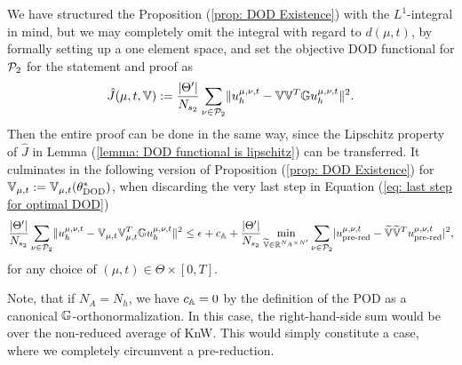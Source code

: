 \begin{remark} \label{remark: discrete optimal DOD}
    We have structured the Proposition (\ref{prop: DOD Existence}) with the $L^1$-integral in mind, but we 
    may completely omit the integral with regard to $d(\mu, t)$, 
    by formally setting up a one element space, and set the 
    objective DOD functional for $\mathcal{P}_2$ for the statement and proof
    as
    \begin{equation*}
        \hat J(\mu, t, \mathbb{V}) := \frac{\lvert \Theta' \rvert}{N_{s_2}} \sum_{\nu \in \mathcal{P}_2} \lVert u_h^{\mu, \nu, t} - \mathbb{V} \mathbb{V}^T \mathbb{G} u_h^{\mu, \nu, t} \rVert^2.
    \end{equation*}
    Then the entire proof can be done in the same way, since the Lipschitz property of $\hat J$ in Lemma
    (\ref{lemma: DOD functional is lipschitz}) can be transferred.
    It culminates in the following version of Proposition (\ref{prop: DOD Existence}) for $\mathbb{V}_{\mu, t} :=
    \mathbb{V}_{\mu, t}(\theta^*_\text{DOD})$, when discarding the very last step in 
    Equation (\ref{eq: last step for optimal DOD})
    \begin{equation*}
        \frac{\lvert \Theta' \rvert}{N_{s_2}} \sum_{\nu \in \mathcal{P}_2}
        \lVert u_h^{\mu, \nu, t} - \mathbb{V}_{\mu, t}
        \mathbb{V}_{\mu, t}^T \mathbb{G} u_h^{\mu, \nu, t} \rVert^2 \\
        \leq \epsilon  + c_{\mathbb{A}} + \frac{\lvert \Theta' \rvert}{N_{s_2}} 
        \min\limits_{\widetilde{\mathbb{V}} \in \mathbb{R}^{N_A \times N'}} 
        \sum_{\nu \in \mathcal{P}_2} 
        \lvert u_\text{pre-red}^{\mu, \nu, t} - \widetilde{\mathbb{V}} \widetilde{\mathbb{V}}^T u_\text{pre-red}^{\mu, \nu, t} \rvert^2,
    \end{equation*}
    for any choice of $(\mu, t) \in \Theta \times [0, T]$.

    Note, that if $N_A = N_h$, we have $c_{\mathbb{A}} = 0$ by the definition
    of the POD as a canonical $\mathbb{G}$-orthonormalization. In this case, the right-hand-side sum
    would be over the non-reduced average of KnW. This would simply constitute a case, where we 
    completely circumvent a pre-reduction.
\end{remark}


